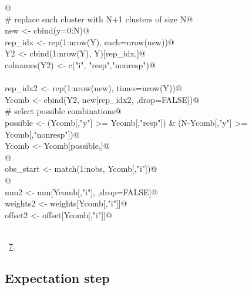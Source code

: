 \documentclass[reqno]{amsart}
\renewcommand{\NWlink}[2]{\hyperlink{#1}{#2}}
\begin{document}
\begin{flushleft}
\begin{list}{}{}
\mbox{}\verb@  @\\
\mbox{}\verb@  # replace each cluster with N+1 clusters of size N@\\
\mbox{}\verb@  new <- cbind(y=0:N)@\\
\mbox{}\verb@  rep_idx <- rep(1:nrow(Y), each=nrow(new))@\\
\mbox{}\verb@  Y2 <- cbind(1:nrow(Y), Y)[rep_idx,]@\\
\mbox{}\verb@  colnames(Y2) <- c("i", "resp","nonresp")@\\
\mbox{}\verb@@\\
\mbox{}\verb@  rep_idx2 <- rep(1:nrow(new), times=nrow(Y))@\\
\mbox{}\verb@  Ycomb <- cbind(Y2, new[rep_idx2, ,drop=FALSE])@\\
\mbox{}\verb@  # select possible combinations@\\
\mbox{}\verb@  possible <- (Ycomb[,"y"] >= Ycomb[,"resp"]) & (N-Ycomb[,"y"] >= Ycomb[,"nonresp"])@\\
\mbox{}\verb@  Ycomb <- Ycomb[possible,]@\\
\mbox{}\verb@  @\\
\mbox{}\verb@  obs_start <- match(1:nobs, Ycomb[,"i"])@\\
\mbox{}\verb@ @\\
\mbox{}\verb@  mm2 <- mm[Ycomb[,"i"], ,drop=FALSE]@\\
\mbox{}\verb@  weights2 <- weights[Ycomb[,"i"]]@\\
\mbox{}\verb@  offset2 <- offset[Ycomb[,"i"]]@\\
\mbox{}\verb@@\\
\mbox{}\verb@@{\NWsep}
\end{list}
\vspace{-1.5ex}
\footnotesize
\begin{list}{}{\setlength{\itemsep}{-\parsep}\setlength{\itemindent}{-\leftmargin}}
\item \NWtxtMacroRefIn\ \NWlink{nuweb7}{7}.

\item{}
\end{list}
\vspace{4ex}
\end{flushleft}
\subsection{Expectation step}
\end{document}
